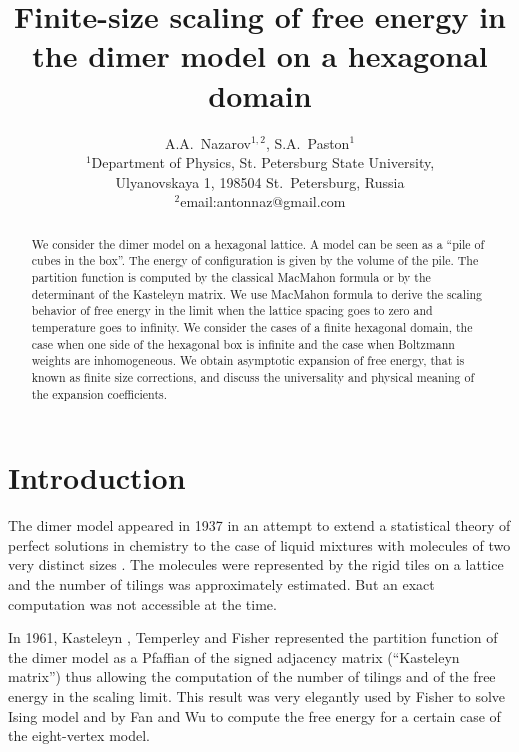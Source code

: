 \documentclass{article}
\begin{document}
\title{Finite-size scaling of free energy in the dimer model on a hexagonal domain}

\author{A.A.~Nazarov$^{1,2}$, S.A.~Paston$^{1}$\\
{\small
  $^{1}$Department of Physics, St. Petersburg State University,} \\
{\small  Ulyanovskaya 1, 198504 St.~Petersburg, Russia}\\
\small{$^{2}$email:antonnaz@gmail.com}
}
\date{}
\maketitle

\begin{abstract}
  We consider the dimer model on a hexagonal lattice. A model can be seen as a ``pile of cubes in
  the box''. The energy of configuration is given by the volume of the pile. The partition function
  is computed by the classical MacMahon formula or by the determinant of the Kasteleyn matrix. We
  use MacMahon formula to derive the scaling behavior of free energy in the limit when the lattice
  spacing goes to zero and temperature goes to infinity. We consider the cases of a finite hexagonal
  domain, the case when one side of the hexagonal box is infinite and the case when Boltzmann
  weights are inhomogeneous. We obtain asymptotic expansion of free energy, that is known as finite
  size corrections, and discuss the universality and physical meaning of the expansion coefficients.
\end{abstract}


\section*{Introduction}
\label{sec:introduction}
The dimer model appeared in 1937 in an attempt to extend a statistical theory of perfect solutions
in chemistry to the case of liquid mixtures with molecules of two very distinct sizes
\cite{Fowler-1937}. The molecules were represented by the rigid tiles on a lattice and the number of
tilings was approximately estimated. But an exact computation was not accessible at the time.

In 1961, Kasteleyn \cite{P.W-1961}, Temperley and Fisher \cite{doi:10.1080/14786436108243366}
represented the partition function of the dimer model as a Pfaffian of the signed adjacency matrix
(``Kasteleyn matrix'') thus allowing the computation of the number of tilings and of the free energy
in the scaling limit.
This result was very elegantly used by Fisher to solve Ising model \cite{fisher1966dimer} and by Fan
and Wu \cite{Fan-1970} to compute the free energy for a certain case of the eight-vertex model.
\end{document}
